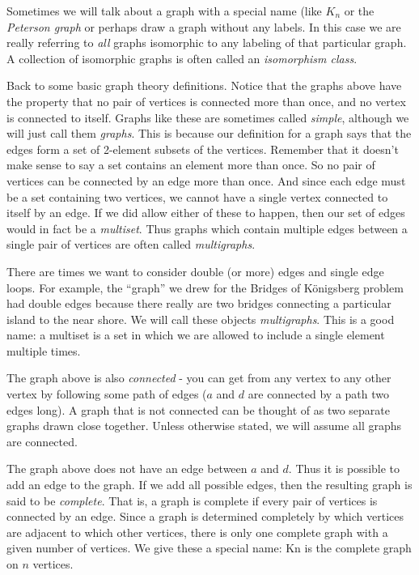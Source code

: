 \documentclass[12pt]{article}
\begin{document}
Sometimes we will talk about a graph with a special name (like $K_n$ or the \emph{Peterson graph} or perhaps draw a graph without any labels.  In this case we are really referring to \emph{all} graphs isomorphic to any labeling of that particular graph.  A collection of isomorphic graphs is often called an \emph{isomorphism class}.

Back to some basic graph theory definitions.  Notice that the graphs above have the property that no pair of vertices is connected more than once, and no vertex is connected to itself.  Graphs like these are sometimes called {\em simple}, although we will just call them {\em graphs}.  This is because our definition for a graph says that the edges form a set of 2-element subsets of the vertices.  Remember that it doesn't make sense to say a set contains an element more than once.  So no pair of vertices can be connected by an edge more than once.  And since each edge must be a set containing two vertices, we cannot have a single vertex connected to itself by an edge.  If we did allow either of these to happen, then our set of edges would in fact be a \emph{multiset}.  Thus graphs which contain multiple edges between a single pair of vertices are often called \emph{multigraphs}.

There are times we want to consider double (or more) edges and single edge loops.  For example, the ``graph'' we drew for the Bridges of K\"onigsberg problem had double edges because there really are two bridges connecting a particular island to the near shore.  We will call these objects {\em multigraphs}.  This is a good name: a multiset is a set in which we are allowed to include a single element multiple times.

The graph above is also {\em connected} - you can get from any vertex to any other vertex by following some path of edges ($a$ and $d$ are connected by a path two edges long).  A graph that is not connected can be thought of as two separate graphs drawn close together.  Unless otherwise stated, we will assume all graphs are connected.  

The graph above does not have an edge between $a$ and $d$.  Thus it is possible to add an edge to the graph.  If we add all possible edges, then the resulting graph is said to be {\em complete}.  That is, a graph is complete if every pair of vertices is connected by an edge.  Since a graph is determined completely by which vertices are adjacent to which other vertices, there is only one complete graph with a given number of vertices.  We give these a special name: \gls{Kn} is the complete graph on $n$ vertices.
\end{document}
